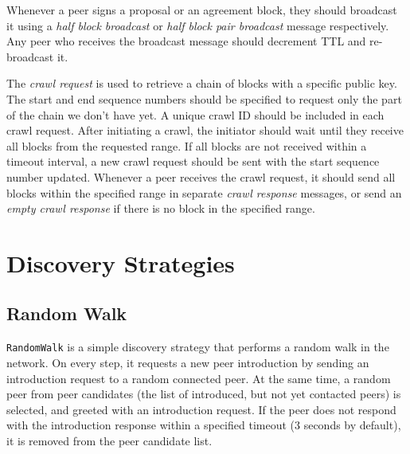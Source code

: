 Whenever a peer signs a proposal or an agreement block, they should broadcast it using a \textit{half block broadcast} or \textit{half block pair broadcast} message respectively. Any peer who receives the broadcast message should decrement TTL and re-broadcast it.

The \textit{crawl request} is used to retrieve a chain of blocks with a specific public key. The start and end sequence numbers should be specified to request only the part of the chain we don't have yet. A unique crawl ID should be included in each crawl request. After initiating a crawl, the initiator should wait until they receive all blocks from the requested range. If all blocks are not received within a timeout interval, a new crawl request should be sent with the start sequence number updated. Whenever a peer receives the crawl request, it should send all blocks within the specified range in separate \textit{crawl response} messages, or send an \textit{empty crawl response} if there is no block in the specified range.





\section{Discovery Strategies}

\subsection{Random Walk}

\texttt{RandomWalk} is a simple discovery strategy that performs a random walk in the network. On every step, it requests a new peer introduction by sending an introduction request to a random connected peer. At the same time, a random peer from peer candidates (the list of introduced, but not yet contacted peers) is selected, and greeted with an introduction request. If the peer does not respond with the introduction response within a specified timeout (3 seconds by default), it is removed from the peer candidate list.

